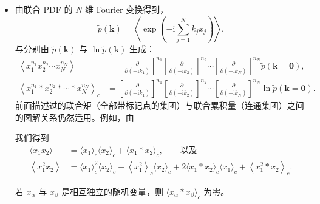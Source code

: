 \begin{itemize}[itemsep=0.45em,topsep=0.4em]
  \item {}由联合 PDF 的 $N$ 维 Fourier 变换得到，
  \begin{equation}\label{eq:2.38}
    \tilde p(\bm{k})=\left\langle\exp\left(-\mathrm{i}\sum_{j=1}^{N}k_jx_j\right)\right\rangle.
  \end{equation}
  与分别由 $\tilde p(\bm{k})$ 与 $\ln\tilde p(\bm{k})$ 生成：
  \begin{equation}\label{eq:2.39}
    \begin{aligned}
      \left\langle x_1^{n_1}x_2^{n_2}\cdots x_N^{n_N}\right\rangle&=\left[\frac{\partial}{\partial(-\mathrm{i}k_1)}\right]^{n_1}\left[\frac{\partial}{\partial(-\mathrm{i}k_2)}\right]^{n_2}\cdots\left[\frac{\partial}{\partial(-\mathrm{i}k_N)}\right]^{n_N}\tilde p(\bm{k}=\bm{0}),\\[4pt]
      \left\langle x_1^{n_1}*x_2^{n_2}*\cdots*x_N^{n_N}\right\rangle_c&=\left[\frac{\partial}{\partial(-\mathrm{i}k_1)}\right]^{n_1}\left[\frac{\partial}{\partial(-\mathrm{i}k_2)}\right]^{n_2}\cdots\left[\frac{\partial}{\partial(-\mathrm{i}k_N)}\right]^{n_N}\ln\tilde p(\bm{k}=\bm{0}).
    \end{aligned}
  \end{equation}
  前面描述过的联合矩（全部带标记点的集团）与联合累积量（连通集团）之间的图解关系仍然适用。例如，由

  \begin{center}
  \end{center}

  我们得到
  \begin{equation}\label{eq:2.40}
    \begin{aligned}
      \langle x_1x_2\rangle&=\langle x_1\rangle_c\langle x_2\rangle_c+\langle x_1*x_2\rangle_c,\qquad\text{以及}\\
      \left\langle x_1^2x_2\right\rangle&=\langle x_1\rangle_c^2\langle x_2\rangle_c+\left\langle x_1^2\right\rangle_c\langle x_2\rangle_c+2\langle x_1*x_2\rangle_c\langle x_1\rangle_c+\left\langle x_1^2*x_2\right\rangle_c.
    \end{aligned}
  \end{equation}

若 $x_\alpha$ 与 $x_\beta$ 是相互独立的随机变量，则 $\langle x_\alpha*x_\beta\rangle_c$ 为零。


\end{itemize}
